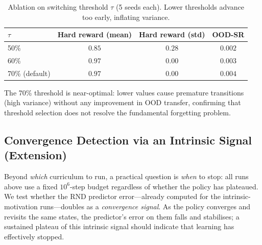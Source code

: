 \documentclass{article}
\begin{document}
\begin{table}[h]
\centering
\caption{Ablation on switching threshold $\tau$ (5 seeds each). Lower thresholds advance too early, inflating variance.}
\label{tab:ablation}
\begin{tabular}{lccc}
\toprule
$\tau$ & \textbf{Hard reward (mean)} & \textbf{Hard reward (std)} & \textbf{OOD-SR}\\
\midrule
50\% & $0.85$ & $0.28$ & $0.002$\\
60\% & $0.97$ & $0.00$ & $0.003$\\
70\% (default) & $0.97$ & $0.00$ & $0.004$\\
\bottomrule
\end{tabular}
\end{table}

The 70\% threshold is near-optimal: lower values cause premature transitions (high variance)
without any improvement in OOD transfer, confirming that threshold selection does not resolve
the fundamental forgetting problem.

\subsection{Convergence Detection via an Intrinsic Signal (Extension)}

Beyond \emph{which} curriculum to run, a practical question is \emph{when} to stop:
all runs above use a fixed $10^6$-step budget regardless of whether the policy has
plateaued. We test whether the RND predictor error---already computed for the
intrinsic-motivation runs---doubles as a \emph{convergence signal}. As the policy
converges and revisits the same states, the predictor's error on them falls and
stabilises; a sustained plateau of this intrinsic signal should indicate that
learning has effectively stopped.
\end{document}

